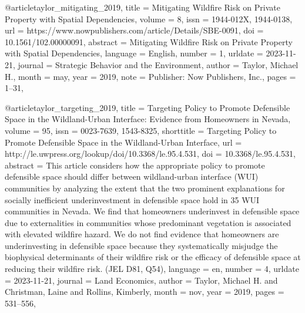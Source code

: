 {{{@article{taylor_mitigating_2019,
	title = {Mitigating {Wildfire} {Risk} on {Private} {Property} with {Spatial} {Dependencies}},
	volume = {8},
	issn = {1944-012X, 1944-0138},
	url = {https://www.nowpublishers.com/article/Details/SBE-0091},
	doi = {10.1561/102.00000091},
	abstract = {Mitigating Wildfire Risk on Private Property with Spatial Dependencies},
	language = {English},
	number = {1},
	urldate = {2023-11-21},
	journal = {Strategic Behavior and the Environment},
	author = {Taylor, Michael H.},
	month = may,
	year = {2019},
	note = {Publisher: Now Publishers, Inc.},
	pages = {1--31},
}

@article{taylor_targeting_2019,
	title = {Targeting {Policy} to {Promote} {Defensible} {Space} in the {Wildland}-{Urban} {Interface}: {Evidence} from {Homeowners} in {Nevada}},
	volume = {95},
	issn = {0023-7639, 1543-8325},
	shorttitle = {Targeting {Policy} to {Promote} {Defensible} {Space} in the {Wildland}-{Urban} {Interface}},
	url = {http://le.uwpress.org/lookup/doi/10.3368/le.95.4.531},
	doi = {10.3368/le.95.4.531},
	abstract = {This article considers how the appropriate policy to promote defensible space should differ between wildland-urban interface (WUI) communities by analyzing the extent that the two prominent explanations for socially inefficient underinvestment in defensible space hold in 35 WUI communities in Nevada. We find that homeowners underinvest in defensible space due to externalities in communities whose predominant vegetation is associated with elevated wildfire hazard. We do not find evidence that homeowners are underinvesting in defensible space because they systematically misjudge the biophysical determinants of their wildfire risk or the efficacy of defensible space at reducing their wildfire risk. (JEL D81, Q54)},
	language = {en},
	number = {4},
	urldate = {2023-11-21},
	journal = {Land Economics},
	author = {Taylor, Michael H. and Christman, Laine and Rollins, Kimberly},
	month = nov,
	year = {2019},
	pages = {531--556},
}

}}}
